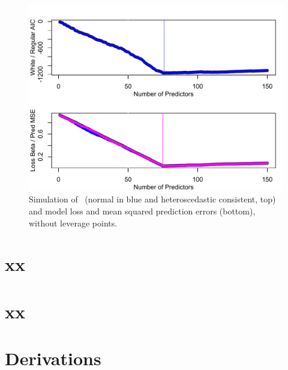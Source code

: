 \documentclass[12pt]{article}
\begin{document}
 \begin{figure}
 \caption{ Simulation of \aic\ (normal in blue and heteroscedastic consistent,
 top) and model loss and mean squared prediction errors (bottom), without
leverage points. }
 \label{fig:example2}
  \centerline{ \includegraphics[width=5in]{figures/example2.pdf} }
 \end{figure}



\section{ xx }
\label{sec:}


\section{ xx }
\label{sec:}



\section{ Derivations  }
\label{sec:derive}





\end{document}
